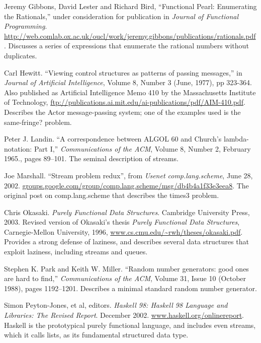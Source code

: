 Jeremy Gibbons, David Lester and Richard Bird, ``Functional Pearl:
Enumerating the Rationals,'' under consideration for publication in
\emph{Journal of Functional Programming}.
\url{http://web.comlab.ox.ac.uk/oucl/work/jeremy.gibbons/publications/rationals.pdf}.
Discusses a series of expressions that enumerate the rational numbers
without duplicates.

Carl Hewitt. ``Viewing control structures as patterns of passing
messages,'' in \emph{Journal of Artificial Intelligence}, Volume 8,
Number 3 (June, 1977), pp 323-364. Also published as Artificial
Intelligence Memo 410 by the Massachusetts Institute of Technology,
\url{ftp://publications.ai.mit.edu/ai-publications/pdf/AIM-410.pdf}.
Describes the Actor message-passing system; one of the examples used is
the same-fringe? problem.

Peter J. Landin. ``A correspondence between ALGOL 60 and Church's
lambda-notation: Part I,'' \emph{Communications of the ACM}, Volume 8,
Number 2, February 1965., pages 89--101. The seminal description of
streams.

Joe Marshall. ``Stream problem redux'', from \emph{Usenet
comp.lang.scheme}, June 28, 2002.
\href{http://groups.google.com/group/comp.lang.scheme/msg/db4b4a1f33e3eea8}{groups.google.com/group/comp.lang.scheme/msg/db4b4a1f33e3eea8}.
The original post on comp.lang.scheme that describes the times3 problem.

Chris Okasaki. \emph{Purely Functional Data Structures}. Cambridge
University Press, 2003. Revised version of Okasaki's thesis \emph{Purely
Functional Data Structures}, Carnegie-Mellon University, 1996,
\href{http://www.cs.cmu.edu/~rwh/theses/okasaki.pdf}{www.cs.cmu.edu/\textasciitilde{}rwh/theses/okasaki.pdf}.
Provides a strong defense of laziness, and describes several data
structures that exploit laziness, including streams and queues.

Stephen K. Park and Keith W. Miller. ``Random number generators: good
ones are hard to find,'' \emph{Communications of the ACM}, Volume 31,
Issue 10 (October 1988), pages 1192--1201. Describes a minimal standard
random number generator.

Simon Peyton-Jones, et al, editors. \emph{Haskell 98: Haskell 98
Language and Libraries: The Revised Report}. December 2002.
\href{http://www.haskell.org/onlinereport}{www.haskell.org/onlinereport}.
Haskell is the prototypical purely functional language, and includes
even streams, which it calls lists, as its fundamental structured data
type.

